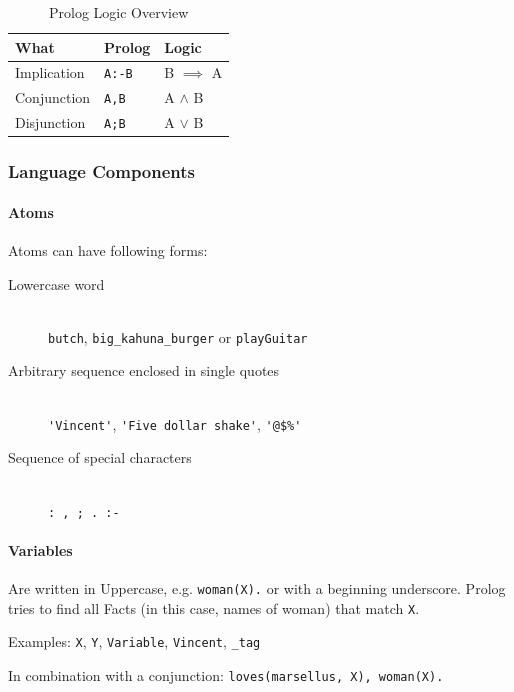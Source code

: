 \begin{table}[H]
	\centering
	\begin{tabu} to \linewidth {l l l}
		\toprule
		What & Prolog & Logic \\
		\midrule
		Implication & \lstinline|A:-B| & B $\implies$ A \\
		Conjunction & \lstinline|A,B| & A $\land$ B \\
		Disjunction & \lstinline|A;B|  & A $\lor$ B \\
		\bottomrule
	\end{tabu}
	\label{tbl:prologLogicOverview}
	\caption{Prolog Logic Overview}
\end{table}

\subsubsection{Language Components}

\paragraph{Atoms}

Atoms can have following forms: 

\begin{description}
	\item[Lowercase word] \hfill \\
		\lstinline|butch|, \lstinline|big_kahuna_burger| or \lstinline|playGuitar|
	\item[Arbitrary sequence enclosed in single quotes] \hfill \\
		\lstinline|'Vincent'|, \lstinline|'Five dollar shake'|, \lstinline|'@$%'|
	\item[Sequence of special characters] \hfill \\
		\lstinline|: , ; . :-|
\end{description}

\paragraph{Variables}

Are written in Uppercase, e.g. \lstinline|woman(X).| or with a beginning underscore. Prolog tries to find all Facts (in this case, names of woman) that match \lstinline|X|.

Examples: \lstinline|X|, \lstinline|Y|, \lstinline|Variable|, \lstinline|Vincent|, \lstinline|_tag|

In combination with a conjunction: \lstinline|loves(marsellus, X), woman(X).|

